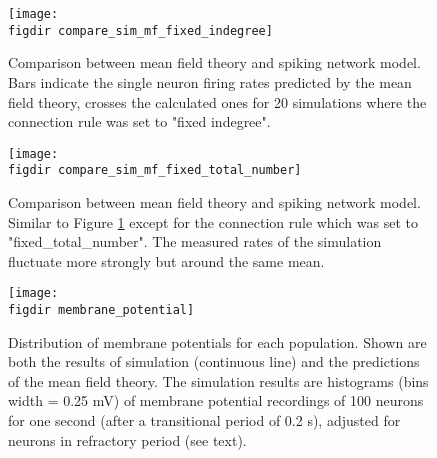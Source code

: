 \begin{figure}[htpb]
    \centering
    \texttt{[image: \\figdir compare\_sim\_mf\_fixed\_indegree]}
    \caption{Comparison between mean field theory and spiking network model. 
        Bars indicate the single neuron firing rates predicted by the mean field 
        theory, crosses the calculated ones for 20 simulations where the connection
        rule was set to "fixed indegree".
    }
    \label{fig:compare_sim_mf_fixed_indegree}
\end{figure}
\begin{figure}[htpb]
    \centering
    \texttt{[image: \\figdir compare\_sim\_mf\_fixed\_total\_number]}
    \caption{Comparison between mean field theory and spiking network model.
        Similar to Figure \ref{fig:compare_sim_mf_fixed_indegree} except for the connection 
        rule which was set to "fixed\_total\_number". The measured rates of the simulation 
        fluctuate more strongly but around the same mean. 
    }
    \label{fig:compare_sim_mf_fixed_total_number}
\end{figure}

\begin{figure}[htpb]
    \centering
    \texttt{[image: \\figdir membrane\_potential]}
    \caption{Distribution of membrane potentials for each population. 
        Shown are both the results of simulation (continuous line) and 
        the predictions of the mean field theory. The simulation results 
        are histograms (bins width = 0.25 mV) of membrane potential recordings 
        of 100 neurons for one second (after a transitional period of 0.2 s), 
        adjusted for neurons in refractory period (see text). 
    }
    \label{fig:membrane_potential}
\end{figure}
